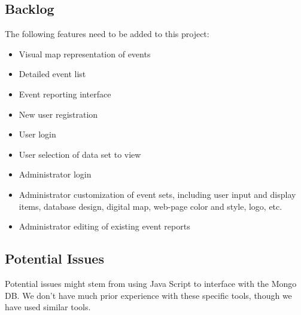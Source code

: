\subsection{Backlog}
The following features need to be added to this project:
\begin{itemize}
\item Visual map representation of events
\item Detailed event list
\item Event reporting interface
\item New user registration
\item User login
\item User selection of data set to view
\item Administrator login
\item Administrator customization of event sets, including user input and display items, database design, digital map, web-page color and style, logo, etc. 
\item Administrator editing of existing event reports
\end{itemize}
\subsection{Potential Issues}
Potential issues might stem from using Java Script to interface with the Mongo DB. We don't have much prior experience with these specific tools, though we have used similar tools.